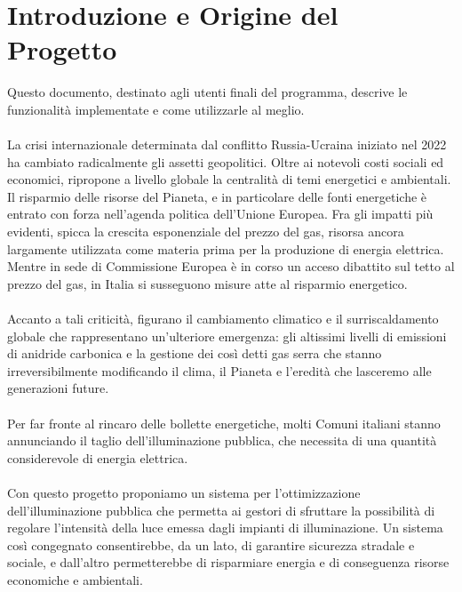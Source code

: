 \documentclass[a4paper, 12pt]{article}
\begin{document}
\makeindexdetails
\makefrontpage \makeversioni
\tableofcontents
\newpage
\clearpage
{}
\newpage
\listoffigures
\newpage
\section{Introduzione e Origine del Progetto}
Questo documento, destinato agli utenti finali del programma, descrive le funzionalità implementate e come utilizzarle al meglio.\\ \\
La crisi internazionale determinata dal conflitto Russia-Ucraina iniziato nel 2022 ha cambiato radicalmente gli assetti geopolitici. Oltre ai notevoli costi sociali ed economici, ripropone a livello globale la centralità di temi energetici e ambientali.\\
Il risparmio delle risorse del Pianeta, e in particolare delle fonti energetiche è entrato con forza nell'agenda politica dell'Unione Europea. Fra gli impatti più evidenti, spicca la crescita esponenziale del prezzo del gas, risorsa ancora largamente utilizzata come materia prima per la produzione di energia elettrica. Mentre in sede di Commissione Europea è in corso un acceso dibattito sul tetto al prezzo del gas, in Italia si susseguono misure atte al risparmio energetico.\\\\

Accanto a tali criticità, figurano il cambiamento climatico e il surriscaldamento globale che rappresentano un'ulteriore emergenza: gli altissimi livelli di emissioni di anidride carbonica e la gestione dei così detti gas serra che stanno irreversibilmente modificando il clima, il Pianeta e l'eredità che lasceremo alle generazioni future.\\\\
Per far fronte al rincaro delle bollette energetiche, molti Comuni italiani stanno annunciando il taglio dell'illuminazione pubblica, che necessita di una quantità considerevole di energia elettrica.\\\\
Con questo progetto proponiamo un sistema per l'ottimizzazione dell'illuminazione pubblica che permetta ai gestori di sfruttare la possibilità di regolare l'intensità della luce emessa dagli impianti di illuminazione. Un sistema così congegnato consentirebbe, da un lato, di garantire sicurezza stradale e sociale, e dall'altro permetterebbe di risparmiare energia e di conseguenza risorse economiche e ambientali.
\end{document}
